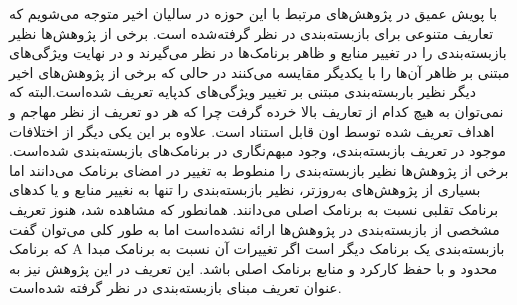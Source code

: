 با پویش عمیق در پژوهش‌های مرتبط با این حوزه در سالیان اخیر متوجه می‌شویم که تعاریف متنوعی برای بازبسته‌بندی در نظر گرفته‌شده است. برخی از پژوهش‌ها نظیر  بازبسته‌بندی را در تغییر منابع و ظاهر برنامک‌ها در نظر می‌گیرند و در نهایت ویژگی‌های مبتنی بر ظاهر آن‌ها را با یکدیگر مقایسه می‌کنند در حالی که برخی از پژوهش‌های اخیر دیگر نظیر  باربسته‌بندی مبتنی بر تغییر ویژگی‌های کد‌پایه تعریف شده‌است.البته که نمی‌توان به هیچ کدام از تعاریف بالا خرده گرفت چرا که هر دو تعریف از نظر مهاجم و اهداف تعریف شده توسط اون قابل استناد است.
 علاوه بر این یکی دیگر از اختلافات موجود در تعریف بازبسته‌بندی، وجود مبهم‌نگاری در برنامک‌های بازبسته‌بندی شده‌است. برخی از پژوهش‌ها نظیر  بازبسته‌بندی را منطوط به تغییر در امضای برنامک می‌دانند اما بسیاری از پژوهش‌های به‌روز‌تر، نظیر  بازبسته‌بندی را تنها به نغییر منابع و یا کد‌های برنامک تقلبی نسبت به برنامک اصلی می‌دانند. همانطور که مشاهده‌ شد، هنوز تعریف مشخصی از بازبسته‌بندی در پژوهش‌ها ارائه‌ نشده‌است اما به طور کلی می‌توان گفت که برنامک A بازبسته‌بندی یک برنامک دیگر است اگر تغییرات آن نسبت به برنامک مبدا محدود و با حفظ کارکرد و منابع برنامک اصلی باشد. این تعریف در این پژوهش نیز به عنوان تعریف مبنای بازبسته‌بندی در نظر گرفته شده‌است.








